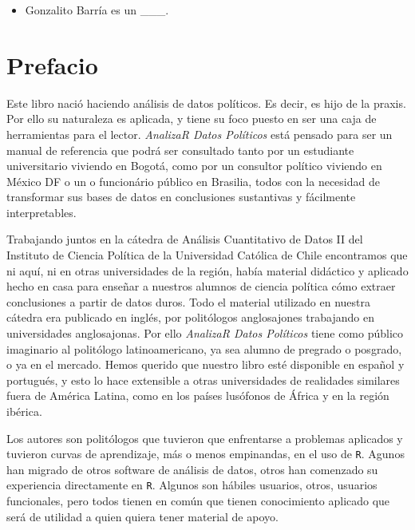 \documentclass[]{book}
\providecommand{\tightlist}{%
  \setlength{\itemsep}{0pt}\setlength{\parskip}{0pt}}
\begin{document}
\begin{itemize}
\tightlist
\item
  Gonzalito Barría es un \_\_\_.
\end{itemize}

\hypertarget{prefacio}{%
\chapter{Prefacio}\label{prefacio}}

Este libro nació haciendo análisis de datos políticos. Es decir, es hijo
de la praxis. Por ello su naturaleza es aplicada, y tiene su foco puesto
en ser una caja de herramientas para el lector. \emph{AnalizaR Datos
Políticos} está pensado para ser un manual de referencia que podrá ser
consultado tanto por un estudiante universitario viviendo en Bogotá,
como por un consultor político viviendo en México DF o un o funcionário
público en Brasilia, todos con la necesidad de transformar sus bases de
datos en conclusiones sustantivas y fácilmente interpretables.

Trabajando juntos en la cátedra de Análisis Cuantitativo de Datos II del
Instituto de Ciencia Política de la Universidad Católica de Chile
encontramos que ni aquí, ni en otras universidades de la región, había
material didáctico y aplicado hecho en casa para enseñar a nuestros
alumnos de ciencia política cómo extraer conclusiones a partir de datos
duros. Todo el material utilizado en nuestra cátedra era publicado en
inglés, por politólogos anglosajones trabajando en universidades
anglosajonas. Por ello \emph{AnalizaR Datos Políticos} tiene como
público imaginario al politólogo latinoamericano, ya sea alumno de
pregrado o posgrado, o ya en el mercado. Hemos querido que nuestro libro
esté disponible en español y portugués, y esto lo hace extensible a
otras universidades de realidades similares fuera de América Latina,
como en los países lusófonos de África y en la región ibérica.

Los autores son politólogos que tuvieron que enfrentarse a problemas
aplicados y tuvieron curvas de aprendizaje, más o menos empinandas, en
el uso de \texttt{R}. Agunos han migrado de otros software de análisis
de datos, otros han comenzado su experiencia directamente en \texttt{R}.
Algunos son hábiles usuarios, otros, usuarios funcionales, pero todos
tienen en común que tienen conocimiento aplicado que será de utilidad a
quien quiera tener material de apoyo.
\end{document}

